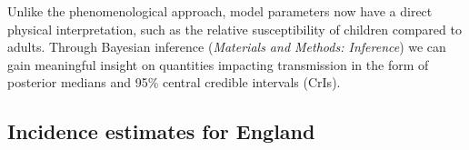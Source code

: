 \documentclass[9pt,twocolumn,twoside]{pnas-new}
\makeatletter
\DeclareRobustCommand\onedot{\futurelet\@let@token\@onedot}
\def\@onedot{\ifx\@let@token.\else.\null\fi\xspace}
\def\eg{e.g\onedot} \def\Eg{{E.g}\onedot}
\makeatother
\begin{document}


Unlike the phenomenological approach, model parameters now have a direct physical interpretation, such as the relative susceptibility of children compared to adults. Through Bayesian inference (\textit{Materials and Methods: Inference}) we can gain meaningful insight on quantities impacting transmission in the form of posterior medians and 95\% central credible intervals (CrIs).

\subsection*{Incidence estimates for England}
\end{document}
